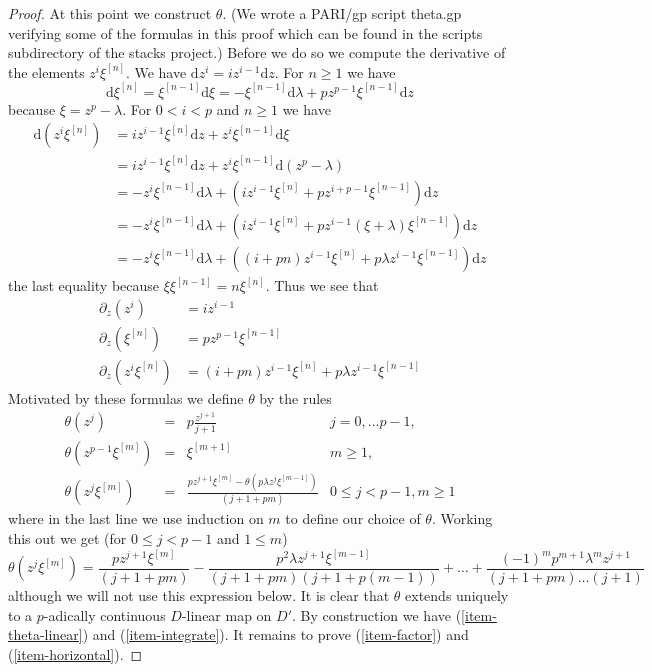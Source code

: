 \begin{proof}
\medskip\noindent
At this point we construct $\theta$. (We wrote a PARI/gp script theta.gp
verifying some of the formulas in this proof which can be found in the
scripts subdirectory of the stacks project.) Before we do so we compute
the derivative of the elements $z^i \xi^{[n]}$. We have
$\text{d}z^i = i z^{i - 1} \text{d}z$. For $n \geq 1$ we have
$$
\text{d}\xi^{[n]} =
\xi^{[n - 1]} \text{d}\xi =
- \xi^{[n - 1]}\text{d}\lambda + p z^{p - 1} \xi^{[n - 1]}\text{d}z
$$
because $\xi = z^p - \lambda$. For $0 < i < p$ and $n \geq 1$ we have
\begin{align*}
\text{d}(z^i\xi^{[n]})
& =
iz^{i - 1}\xi^{[n]}\text{d}z + z^i\xi^{[n - 1]}\text{d}\xi \\
& =
iz^{i - 1}\xi^{[n]}\text{d}z + z^i\xi^{[n - 1]}\text{d}(z^p - \lambda) \\
& =
- z^i\xi^{[n - 1]}\text{d}\lambda +
(iz^{i - 1}\xi^{[n]} + pz^{i + p - 1}\xi^{[n - 1]})\text{d}z \\
& =
- z^i\xi^{[n - 1]}\text{d}\lambda +
(iz^{i - 1}\xi^{[n]} + pz^{i - 1}(\xi + \lambda)\xi^{[n - 1]})\text{d}z \\
& =
- z^i\xi^{[n - 1]}\text{d}\lambda +
((i + pn)z^{i - 1}\xi^{[n]} + p\lambda z^{i - 1}\xi^{[n - 1]})\text{d}z
\end{align*}
the last equality because $\xi \xi^{[n - 1]} = n\xi^{[n]}$.
Thus we see that
\begin{align*}
\partial_z(z^i) & = i z^{i - 1} \\
\partial_z(\xi^{[n]}) & = p z^{p - 1} \xi^{[n - 1]} \\
\partial_z(z^i\xi^{[n]}) & =
(i + pn) z^{i - 1} \xi^{[n]} + p \lambda z^{i - 1}\xi^{[n - 1]}
\end{align*}
Motivated by these formulas we define $\theta$ by the rules
$$
\begin{matrix}
\theta(z^j)
& = & p\frac{z^{j + 1}}{j + 1}
& j = 0, \ldots p - 1, \\
\theta(z^{p - 1}\xi^{[m]})
& = & \xi^{[m + 1]}
& m \geq 1, \\
\theta(z^j \xi^{[m]})
& = &
\frac{p z^{j + 1} \xi^{[m]} - \theta(p\lambda z^j \xi^{[m - 1]})}{(j + 1 + pm)}
& 0 \leq j < p - 1, m \geq 1
\end{matrix}
$$
where in the last line we use induction on $m$ to define our choice of
$\theta$. Working this out we get (for $0 \leq j < p - 1$ and $1 \leq m$)
$$
\theta(z^j \xi^{[m]}) =
\textstyle\frac{p z^{j + 1} \xi^{[m]}}{(j + 1 + pm)} -
\frac{p^2 \lambda z^{j + 1} \xi^{[m - 1]}}{(j + 1 + pm)(j + 1 + p(m - 1))} +
\ldots +
\frac{(-1)^m p^{m + 1} \lambda^m z^{j + 1}}
{(j + 1 + pm) \ldots (j + 1)}
$$
although we will not use this expression below. It is clear that $\theta$
extends uniquely to a $p$-adically continuous $D$-linear map on $D'$.
By construction we have (\ref{item-theta-linear}) and (\ref{item-integrate}).
It remains to prove (\ref{item-factor}) and (\ref{item-horizontal}).


\end{proof}
